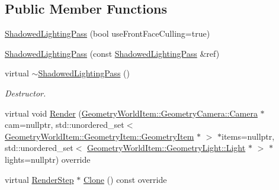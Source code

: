 \subsection*{Public Member Functions}
\begin{DoxyCompactItemize}
\item 
\mbox{\hyperlink{class_geometry_engine_1_1_geometry_render_step_1_1_shadowed_lighting_pass_a16b97807a606bb5ac276e6c9c6e5f745}{Shadowed\+Lighting\+Pass}} (bool use\+Front\+Face\+Culling=true)
\item 
\mbox{\hyperlink{class_geometry_engine_1_1_geometry_render_step_1_1_shadowed_lighting_pass_abf51ceddfb91cb0749f15074cc067e12}{Shadowed\+Lighting\+Pass}} (const \mbox{\hyperlink{class_geometry_engine_1_1_geometry_render_step_1_1_shadowed_lighting_pass}{Shadowed\+Lighting\+Pass}} \&ref)
\item 
\mbox{\label{class_geometry_engine_1_1_geometry_render_step_1_1_shadowed_lighting_pass_a023b4f4a44fd25c1e0f6695a604b1f72}} 
virtual \mbox{\hyperlink{class_geometry_engine_1_1_geometry_render_step_1_1_shadowed_lighting_pass_a023b4f4a44fd25c1e0f6695a604b1f72}{$\sim$\+Shadowed\+Lighting\+Pass}} ()
\begin{DoxyCompactList}\small\item\em Destructor. \end{DoxyCompactList}\item 
virtual void \mbox{\hyperlink{class_geometry_engine_1_1_geometry_render_step_1_1_shadowed_lighting_pass_af52807435083cd96125e6ef6d7453027}{Render}} (\mbox{\hyperlink{class_geometry_engine_1_1_geometry_world_item_1_1_geometry_camera_1_1_camera}{Geometry\+World\+Item\+::\+Geometry\+Camera\+::\+Camera}} $\ast$cam=nullptr, std\+::unordered\+\_\+set$<$ \mbox{\hyperlink{class_geometry_engine_1_1_geometry_world_item_1_1_geometry_item_1_1_geometry_item}{Geometry\+World\+Item\+::\+Geometry\+Item\+::\+Geometry\+Item}} $\ast$ $>$ $\ast$items=nullptr, std\+::unordered\+\_\+set$<$ \mbox{\hyperlink{class_geometry_engine_1_1_geometry_world_item_1_1_geometry_light_1_1_light}{Geometry\+World\+Item\+::\+Geometry\+Light\+::\+Light}} $\ast$ $>$ $\ast$lights=nullptr) override
\item 
virtual \mbox{\hyperlink{class_geometry_engine_1_1_geometry_render_step_1_1_render_step}{Render\+Step}} $\ast$ \mbox{\hyperlink{class_geometry_engine_1_1_geometry_render_step_1_1_shadowed_lighting_pass_a73176d6860aee0903034eeaf93edb40d}{Clone}} () const override
\end{DoxyCompactItemize}
